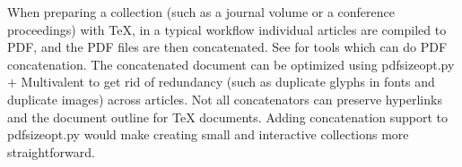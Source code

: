 \documentclass{ltugproc}
\def\cmd{\textsf}
\begin{document}
When preparing a collection (such as a journal volume or a conference
proceedings) with \TeX{}, in a typical workflow individual articles are
compiled to PDF, and the PDF files are then concatenated. See
\cite{pdf-concatenate} for tools which can do PDF concatenation. The
concatenated document can be optimized using \cmd{pdfsizeopt.py} $+$
Multivalent to get rid of redundancy (such as duplicate glyphs in fonts and
duplicate images) across articles. Not all concatenators can preserve
hyperlinks and the document outline for \TeX{} documents. Adding
concatenation support to \cmd{pdfsizeopt.py} would make creating small and
interactive collections more straightforward.


%


{  %
}
\end{document}
